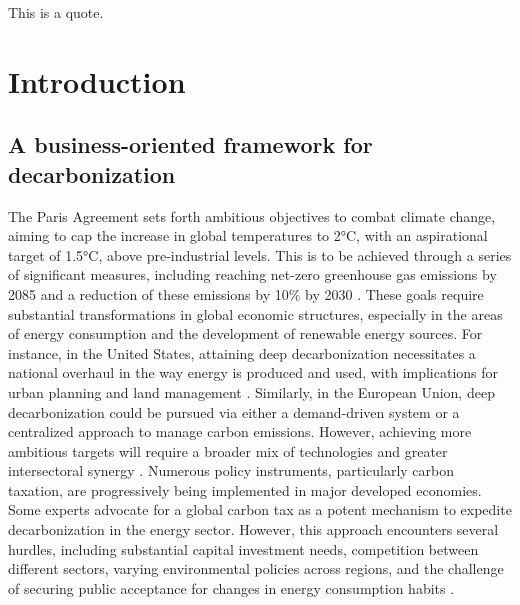 \begin{savequote}[75mm]
This is a quote.
\end{savequote}

\chapter{Introduction}
\section{A business-oriented framework for decarbonization}
\noindent The Paris Agreement sets forth ambitious objectives to combat climate change, aiming to cap the increase in global temperatures to 2°C, with an aspirational target of 1.5°C, above pre-industrial levels. This is to be achieved through a series of significant measures, including reaching net-zero greenhouse gas emissions by 2085 and a reduction of these emissions by 10\% by 2030 \cite{Sanderson2016What}. These goals require substantial transformations in global economic structures, especially in the areas of energy consumption and the development of renewable energy sources. For instance, in the United States, attaining deep decarbonization necessitates a national overhaul in the way energy is produced and used, with implications for urban planning and land management \cite{Hsu2022Planning}. Similarly, in the European Union, deep decarbonization could be pursued via either a demand-driven system or a centralized approach to manage carbon emissions. However, achieving more ambitious targets will require a broader mix of technologies and greater intersectoral synergy \cite{Korkmaz2020A}. Numerous policy instruments, particularly carbon taxation, are progressively being implemented in major developed economies. Some experts advocate for a global carbon tax as a potent mechanism to expedite decarbonization in the energy sector. However, this approach encounters several hurdles, including substantial capital investment needs, competition between different sectors, varying environmental policies across regions, and the challenge of securing public acceptance for changes in energy consumption habits \cite{Papadis2020Challenges}.


